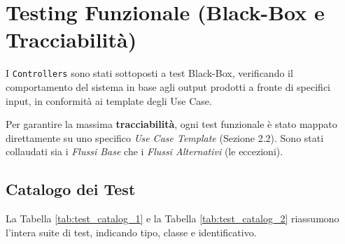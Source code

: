\section{Testing Funzionale (Black-Box e Tracciabilità)}

I \texttt{Controllers} sono stati sottoposti a test Black-Box, verificando il comportamento del sistema in base agli output prodotti a fronte di specifici input, in conformità ai template degli Use Case.

Per garantire la massima \textbf{tracciabilità}, ogni test funzionale è stato mappato direttamente su uno specifico \textit{Use Case Template} (Sezione 2.2). Sono stati collaudati sia i \textit{Flussi Base} che i \textit{Flussi Alternativi} (le eccezioni).

\subsection{Catalogo dei Test}
La Tabella \ref{tab:test_catalog_1} e la Tabella \ref{tab:test_catalog_2} riassumono l'intera suite di test, indicando tipo, classe e identificativo.

